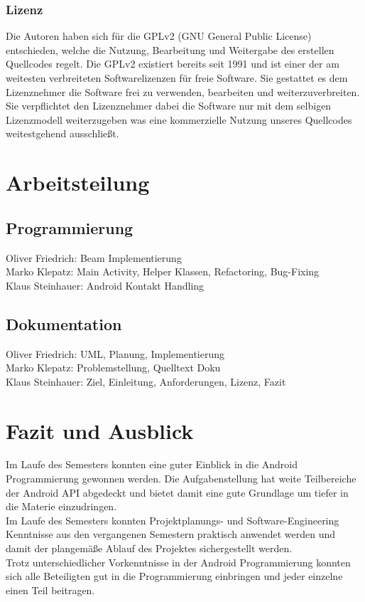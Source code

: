 \documentclass[a4paper,ngerman,12pt]{report}
\begin{document}
\subsection*{Lizenz}

Die Autoren haben sich für die GPLv2 (GNU General Public License) entschieden, welche die Nutzung, Bearbeitung und Weitergabe des erstellen Quellcodes regelt. Die GPLv2 existiert bereits seit 1991 und ist einer der am weitesten verbreiteten Softwarelizenzen für freie Software. Sie gestattet es dem Lizenznehmer die Software frei zu verwenden, bearbeiten und weiterzuverbreiten. Sie verpflichtet den Lizenznehmer dabei die Software nur mit dem selbigen Lizenzmodell weiterzugeben was eine kommerzielle Nutzung unseres Quellcodes weitestgehend ausschließt. 

\chapter{Arbeitsteilung}
\section*{Programmierung}

Oliver Friedrich: Beam Implementierung \\ 
Marko Klepatz: Main Activity, Helper Klassen, Refactoring, Bug-Fixing\\
Klaus Steinhauer: Android Kontakt Handling\\ 

\section*{Dokumentation}

Oliver Friedrich: UML, Planung, Implementierung\\
Marko Klepatz: Problemstellung, Quelltext Doku\\
Klaus Steinhauer: Ziel, Einleitung, Anforderungen, Lizenz, Fazit\\

\chapter{Fazit und Ausblick}

Im Laufe des Semesters konnten eine guter Einblick in die Android Programmierung gewonnen werden. Die Aufgabenstellung hat weite Teilbereiche der Android API abgedeckt und bietet damit eine gute Grundlage um tiefer in die Materie einzudringen. \\
Im Laufe des Semesters konnten Projektplanungs- und Software-Engineering Kenntnisse aus den vergangenen Semestern praktisch anwendet werden und damit der plangemäße Ablauf des Projektes sichergestellt werden.\\ 
Trotz unterschiedlicher Vorkenntnisse in der Android Programmierung konnten sich alle Beteiligten gut in die Programmierung einbringen und jeder einzelne einen Teil beitragen.
\end{document}
